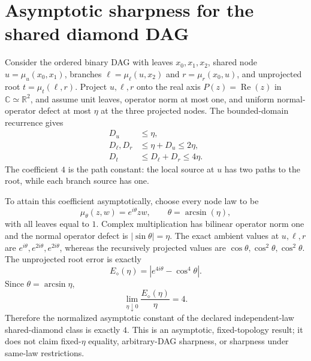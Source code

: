 \section{Asymptotic sharpness for the shared diamond DAG}
\label{sec:diamond-dag-asymptotic-sharpness}

Consider the ordered binary DAG with leaves $x_0,x_1,x_2$, shared node
$u=\mu_u(x_0,x_1)$, branches
$\ell=\mu_\ell(u,x_2)$ and $r=\mu_r(x_0,u)$, and unprojected root
$t=\mu_t(\ell,r)$.  Project $u,\ell,r$ onto the real axis
$P(z)=\operatorname{Re}(z)$ in $\mathbb C\simeq\mathbb R^2$, and assume unit
leaves, operator norm at most one, and uniform normal-operator defect at most
$\eta$ at the three projected nodes.  The bounded-domain recurrence gives
\begin{align*}
 D_u&\le\eta,\\
 D_\ell,D_r&\le\eta+D_u\le2\eta,\\
 D_t&\le D_\ell+D_r\le4\eta.
\end{align*}
The coefficient $4$ is the path constant: the local source at $u$ has two
paths to the root, while each branch source has one.

To attain this coefficient asymptotically, choose every node law to be
\begin{equation*}
 \mu_\theta(z,w)=e^{i\theta}zw,
 \qquad \theta=\arcsin(\eta),
\end{equation*}
with all leaves equal to $1$.  Complex multiplication has bilinear operator
norm one and the normal operator defect is $|\sin\theta|=\eta$.  The exact
ambient values at $u,\ell,r$ are $e^{i\theta},e^{2i\theta},e^{2i\theta}$,
whereas the recursively projected values are
$\cos\theta,\cos^2\theta,\cos^2\theta$.  The unprojected root error is exactly
\begin{equation*}
 E_\diamond(\eta)=\left|e^{4i\theta}-\cos^4\theta\right|.
\end{equation*}
Since $\theta=\arcsin\eta$,
\begin{equation*}
 \lim_{\eta\downarrow0}\frac{E_\diamond(\eta)}{\eta}=4.
\end{equation*}
Therefore the normalized asymptotic constant of the declared independent-law
shared-diamond class is exactly $4$.  This is an asymptotic, fixed-topology
result; it does not claim fixed-$\eta$ equality, arbitrary-DAG sharpness, or
sharpness under same-law restrictions.


